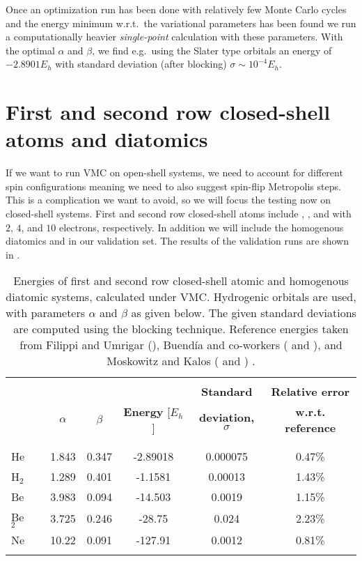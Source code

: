 \documentclass[../../master.tex]{subfiles}
\begin{document}
Once an optimization run has been done  with relatively few Monte Carlo cycles and the energy minimum w.r.t.\ the variational parameters has been found we run a computationally heavier \emph{single-point} calculation with these parameters. With the optimal $\alpha$ and $\beta$, we find e.g.\ using the Slater type orbitals an energy of $-2.8901E_h$ with standard deviation (after blocking) $\sigma\sim10^{-4}E_h$. 

\section{First and second row closed-shell atoms and diatomics}
If we want to run VMC on open-shell systems, we need to account for different spin configurations meaning we need to also suggest spin-flip Metropolis steps. This is a complication we want to avoid, so we will focus the testing now on closed-shell systems. First and second row closed-shell atoms include , , and  with $2$, $4$, and $10$ electrons, respectively. In addition we will include the homogenous diatomics  and  in our validation set. The results of the validation runs are shown in . 

\begin{table}
\centering{}
\setlength\extrarowheight{2pt}
\begin{tabularx}{\textwidth}{X  *{6}{S[table-format=-1.3,table-space-text-post=***]}}
\hline
\hline
\\[-0.9em]
        &  &           &          &                         & \phantom{-}\textbf{Standard} & \phantom{.}\textbf{Relative error}    \\
        &  &  $\alpha$ & $\beta$  & \textbf{Energy} [$E_h$] & \textbf{deviation, } $\sigma$ & \textbf{w.r.t. reference}             \\
\\[-0.9em]
\hline
\\[-0.9em]
He       & & 1.843  & 0.347  & -2.89018  & 0.000075  & 0.47\% \\
H${}_2$  & & 1.289  & 0.401  & -1.1581   & 0.00013   & 1.43\% \\ 
Be       & & 3.983  & 0.094  & -14.503   & 0.0019    & 1.15\% \\
Be${}_2$ & & 3.725  & 0.246  & -28.75    & 0.024     & 2.23\% \\ 
Ne       & & 10.22  & 0.091  & -127.91   & 0.0012    & 0.81\% \\ 
\\[-0.9em]
\hline
\end{tabularx}
\caption{Energies of first and second row closed-shell atomic and homogenous diatomic systems, calculated under VMC. Hydrogenic orbitals are used, with parameters $\alpha$ and $\beta$ as given below. The given standard deviations are computed using the blocking technique. Reference energies taken from Filippi and Umrigar (), Buendía and co-workers ( and ), and Moskowitz and Kalos ( and ) \cite{umrigar,buendia,moskowitz1981new}. \label{tab:vmcval}}
\end{table}
\end{document}
